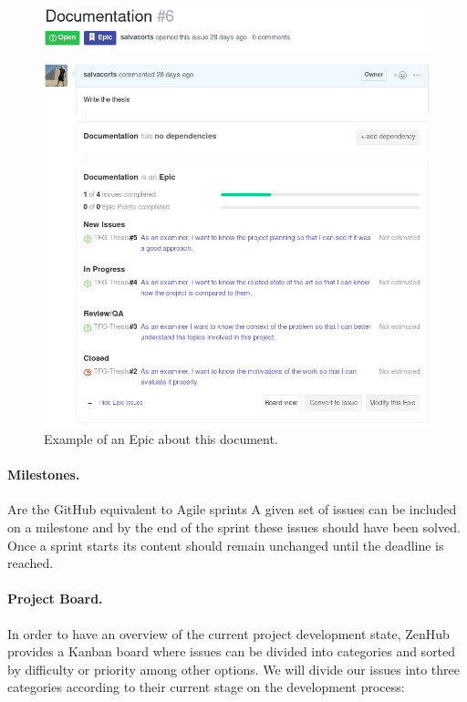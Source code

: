 \begin{figure}[h!]
		\centering
    	\includegraphics[width=\linewidth]{assets/images/epic.png}
    	\caption{Example of an Epic about this document.}
    	\label{fig:epic}
\end{figure}

\paragraph*{Milestones.} Are the GitHub equivalent to Agile sprints A given set of issues can be included on a milestone and by the end of the sprint these issues should have been solved. Once a sprint starts its content should remain unchanged until the deadline is reached.

\paragraph*{Project Board.} In order to have an overview of the current project development state, ZenHub provides a Kanban board \cite{kanban} where issues can be divided into categories and sorted by difficulty or priority among other options. We will divide our issues into three categories according to their current stage on the development process:

